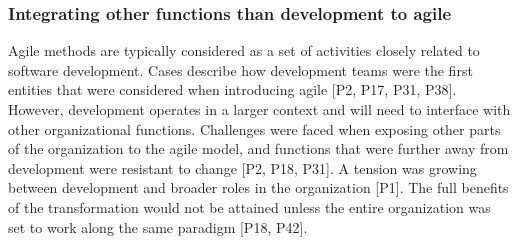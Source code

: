 \documentclass[preprint,authoryear,12pt]{elsarticle}
\begin{document}

%






\subsubsection{Integrating other functions than development to agile}

Agile methods are typically considered as a set of activities closely related to
software development. Cases describe how development teams were the first
entities that were considered when introducing agile [P2, P17, P31, P38].
However, development operates in a larger context and will need to interface
with other organizational functions.
Challenges were faced when exposing other parts of the organization to the agile
model, and functions that were further away from development were resistant to
change [P2, P18, P31]. A tension was growing between development and broader
roles in the organization [P1]. The full benefits of the transformation would
not be attained unless the entire organization was set to work along the same
paradigm [P18, P42].
\end{document}
